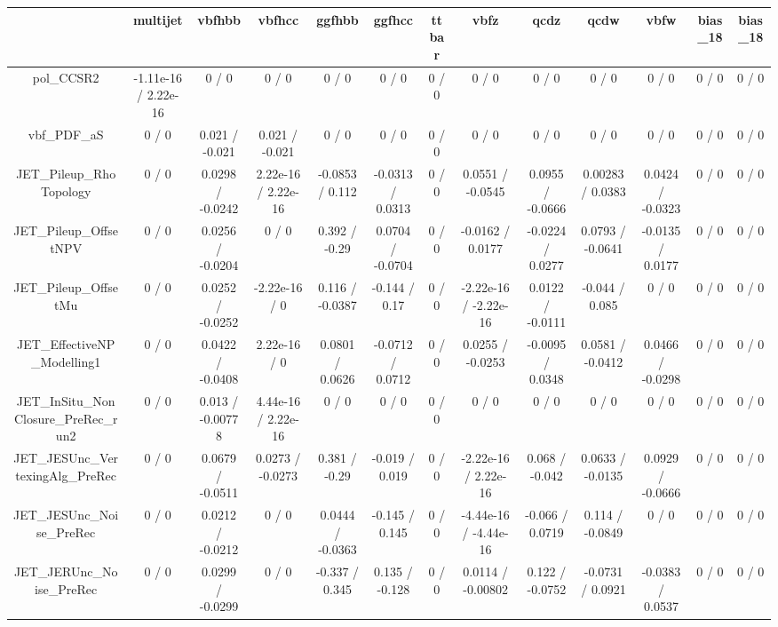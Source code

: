 \documentclass[10pt]{article}
\begin{document}
\begin{table}[htbp]
\begin{center}
\begin{tabular}{|c|c|c|c|c|c|c|c|c|c|c|c|c|}
\hline 
      & multijet      & vbfhbb      & vbfhcc      & ggfhbb      & ggfhcc      & ttbar      & vbfz      & qcdz      & qcdw      & vbfw      & bias_18      & bias_18 \\ 
\hline 
  pol_CCSR2 & -1.11e-16 / 2.22e-16 & 0 / 0 & 0 / 0 & 0 / 0 & 0 / 0 & 0 / 0 & 0 / 0 & 0 / 0 & 0 / 0 & 0 / 0 & 0 / 0 & 0 / 0 \\ 
  vbf_PDF_aS & 0 / 0 & 0.021 / -0.021 & 0.021 / -0.021 & 0 / 0 & 0 / 0 & 0 / 0 & 0 / 0 & 0 / 0 & 0 / 0 & 0 / 0 & 0 / 0 & 0 / 0 \\ 
  JET_Pileup_RhoTopology & 0 / 0 & 0.0298 / -0.0242 & 2.22e-16 / 2.22e-16 & -0.0853 / 0.112 & -0.0313 / 0.0313 & 0 / 0 & 0.0551 / -0.0545 & 0.0955 / -0.0666 & 0.00283 / 0.0383 & 0.0424 / -0.0323 & 0 / 0 & 0 / 0 \\ 
  JET_Pileup_OffsetNPV & 0 / 0 & 0.0256 / -0.0204 & 0 / 0 & 0.392 / -0.29 & 0.0704 / -0.0704 & 0 / 0 & -0.0162 / 0.0177 & -0.0224 / 0.0277 & 0.0793 / -0.0641 & -0.0135 / 0.0177 & 0 / 0 & 0 / 0 \\ 
  JET_Pileup_OffsetMu & 0 / 0 & 0.0252 / -0.0252 & -2.22e-16 / 0 & 0.116 / -0.0387 & -0.144 / 0.17 & 0 / 0 & -2.22e-16 / -2.22e-16 & 0.0122 / -0.0111 & -0.044 / 0.085 & 0 / 0 & 0 / 0 & 0 / 0 \\ 
  JET_EffectiveNP_Modelling1 & 0 / 0 & 0.0422 / -0.0408 & 2.22e-16 / 0 & 0.0801 / 0.0626 & -0.0712 / 0.0712 & 0 / 0 & 0.0255 / -0.0253 & -0.0095 / 0.0348 & 0.0581 / -0.0412 & 0.0466 / -0.0298 & 0 / 0 & 0 / 0 \\ 
  JET_InSitu_NonClosure_PreRec_run2 & 0 / 0 & 0.013 / -0.00778 & 4.44e-16 / 2.22e-16 & 0 / 0 & 0 / 0 & 0 / 0 & 0 / 0 & 0 / 0 & 0 / 0 & 0 / 0 & 0 / 0 & 0 / 0 \\ 
  JET_JESUnc_VertexingAlg_PreRec & 0 / 0 & 0.0679 / -0.0511 & 0.0273 / -0.0273 & 0.381 / -0.29 & -0.019 / 0.019 & 0 / 0 & -2.22e-16 / 2.22e-16 & 0.068 / -0.042 & 0.0633 / -0.0135 & 0.0929 / -0.0666 & 0 / 0 & 0 / 0 \\ 
  JET_JESUnc_Noise_PreRec & 0 / 0 & 0.0212 / -0.0212 & 0 / 0 & 0.0444 / -0.0363 & -0.145 / 0.145 & 0 / 0 & -4.44e-16 / -4.44e-16 & -0.066 / 0.0719 & 0.114 / -0.0849 & 0 / 0 & 0 / 0 & 0 / 0 \\ 
  JET_JERUnc_Noise_PreRec & 0 / 0 & 0.0299 / -0.0299 & 0 / 0 & -0.337 / 0.345 & 0.135 / -0.128 & 0 / 0 & 0.0114 / -0.00802 & 0.122 / -0.0752 & -0.0731 / 0.0921 & -0.0383 / 0.0537 & 0 / 0 & 0 / 0 \\ 

\end{tabular}
\end{center}
\end{table}
\end{document}
